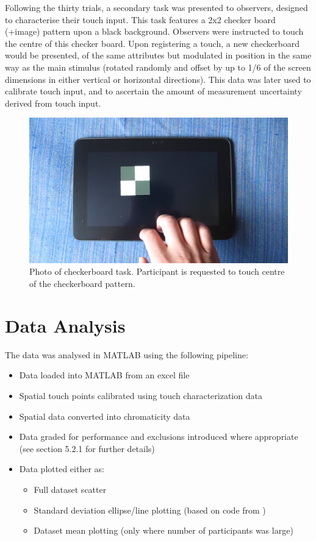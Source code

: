 Following the thirty trials, a secondary task was presented to observers, designed to characterise their touch input. This task features a 2x2 checker board (+image) pattern upon a black background. Observers were instructed to touch the centre of this checker board. Upon registering a touch, a new checkerboard would be presented, of the same attributes but modulated in position in the same way as the main stimulus (rotated randomly and offset by up to 1/6 of the screen dimensions in either vertical or horizontal directions). This data was later used to calibrate touch input, and to ascertain the amount of measurement uncertainty derived from touch input. 

\begin{figure}[hbp]
\includegraphics[width=\textwidth]{figs/tablet/checker_board.png} 
\caption{Photo of checkerboard task. Participant is requested to touch centre of the checkerboard pattern.}
\label{fig:checkerboard}
\end{figure}


\section{Data Analysis}

The data was analysed in MATLAB using the following pipeline:
\begin{itemize}
\item Data loaded into MATLAB from an excel file
\item Spatial touch points calibrated using touch characterization data
\item Spatial data converted into chromaticity data
\item Data graded for performance and exclusions introduced where appropriate (see section 5.2.1 for further details) %
\item Data plotted either as:
\begin{itemize}
\item Full dataset scatter
\item Standard deviation ellipse/line plotting (based on code from ) %
\item Dataset mean plotting (only where number of participants was large)
\end{itemize}
\end{itemize}

